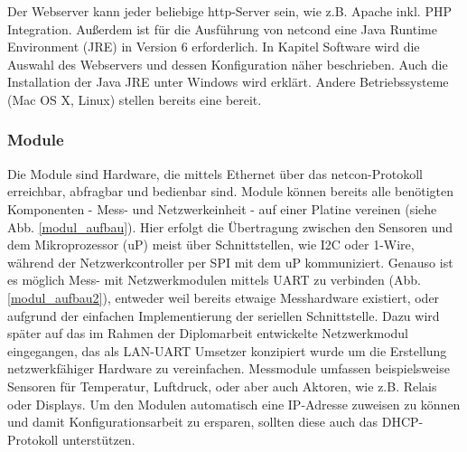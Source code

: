 \documentclass[a4paper,14pt,headsepline]{scrartcl}
\begin{document}
Der Webserver kann jeder beliebige http-Server sein, wie z.B. Apache inkl. PHP Integration. Außerdem ist für die Ausführung von netcond eine Java Runtime Environment (JRE) in Version 6 erforderlich. In Kapitel Software wird die Auswahl des Webservers und dessen Konfiguration näher beschrieben. Auch die Installation der Java JRE unter Windows wird erklärt. Andere Betriebssysteme (Mac OS X, Linux) stellen bereits eine bereit.

\newpage

\subsubsection{Module}

Die Module sind Hardware, die mittels Ethernet über das netcon-Protokoll erreichbar, abfragbar und bedienbar sind. Module können bereits alle benötigten Komponenten - Mess- und Netzwerkeinheit - auf einer Platine vereinen (siehe Abb. \ref{modul_aufbau}). Hier erfolgt die Übertragung zwischen den Sensoren und dem Mikroprozessor (uP) meist über Schnittstellen, wie I2C oder 1-Wire, während der Netzwerkcontroller per SPI mit dem uP kommuniziert. Genauso ist es möglich Mess- mit Netzwerkmodulen mittels UART zu verbinden (Abb. \ref{modul_aufbau2}), entweder weil bereits etwaige Messhardware existiert, oder aufgrund der einfachen Implementierung der seriellen Schnittstelle. Dazu wird später auf das im Rahmen der Diplomarbeit entwickelte Netzwerkmodul eingegangen, das als LAN-UART Umsetzer konzipiert wurde um die Erstellung netzwerkfähiger Hardware zu vereinfachen. Messmodule umfassen beispielsweise Sensoren für Temperatur, Luftdruck, oder aber auch Aktoren, wie z.B. Relais oder Displays. Um den Modulen automatisch eine IP-Adresse zuweisen zu können und damit Konfigurationsarbeit zu ersparen, sollten diese auch das DHCP-Protokoll unterstützen. 

\begin{figure}[h]
\begin{center}
\end{center}
\end{figure}
\end{document}
